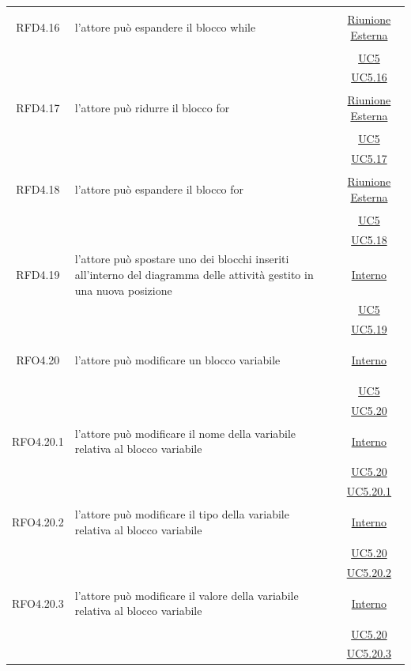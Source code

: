 \begin{longtable}{|c|>{\centering}m{7cm}|c|}
\hypertarget{RFD4.16}{RFD4.16} & l'attore può espandere il blocco while & \hyperlink{Riunione Esterna}{Riunione Esterna}\\
& &\hyperref[UC5]{UC5}\\
& &\hyperref[UC5.16]{UC5.16}\\ \hline

\hypertarget{RFD4.17}{RFD4.17} & l'attore può ridurre il blocco for & \hyperlink{Riunione Esterna}{Riunione Esterna}\\
& &\hyperref[UC5]{UC5}\\
& & \hyperref[UC5.17]{UC5.17}\\ \hline

\hypertarget{RFD4.18}{RFD4.18} & l'attore può espandere il blocco for &  \hyperlink{Riunione Esterna}{Riunione Esterna}\\
& &\hyperref[UC5]{UC5}\\
& &\hyperref[UC5.18]{UC5.18}\\ \hline

\hypertarget{RFD4.19}{RFD4.19} & l'attore può spostare uno dei blocchi inseriti all'interno del diagramma delle attività gestito in una nuova posizione &  \hyperlink{Interno}{Interno}\\
& &\hyperref[UC5]{UC5}\\
& &\hyperref[UC5.19]{UC5.19}\\ \hline

\hypertarget{RFO4.20}{RFO4.20} & l'attore può modificare un blocco variabile &  \hyperlink{Interno}{Interno}\\
& &\hyperref[UC5]{UC5}\\
& &\hyperref[UC5.20]{UC5.20}\\ \hline

\hypertarget{RFO4.20.1}{RFO4.20.1} & l'attore può modificare il nome della variabile relativa al blocco variabile &  \hyperlink{Interno}{Interno}\\
& &\hyperref[UC5.20]{UC5.20}\\
& &\hyperref[UC5.20.1]{UC5.20.1}\\ \hline

\hypertarget{RFO4.20.2}{RFO4.20.2} & l'attore può modificare il tipo della variabile relativa al blocco variabile &  \hyperlink{Interno}{Interno}\\
& &\hyperref[UC5.20]{UC5.20}\\
& &\hyperref[UC5.20.2]{UC5.20.2}\\ \hline

\hypertarget{RFO4.20.3}{RFO4.20.3} & l'attore può modificare il valore della variabile relativa al blocco variabile &  \hyperlink{Interno}{Interno}\\
& &\hyperref[UC5.20]{UC5.20}\\
& &\hyperref[UC5.20.3]{UC5.20.3}\\ \hline


\end{longtable}
